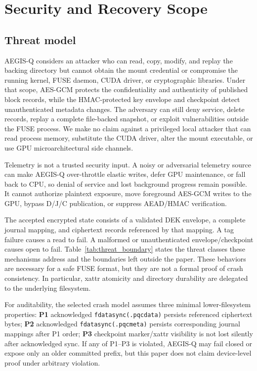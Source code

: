 \section{Security and Recovery Scope}
\label{sec:security}

\subsection{Threat model}
\label{sec:case_study}

AEGIS-Q considers an attacker who can read, copy, modify, and replay the backing directory but cannot obtain the mount credential or compromise the running kernel, FUSE daemon, CUDA driver, or cryptographic libraries.  Under that scope, AES-GCM protects the confidentiality and authenticity of published block records, while the HMAC-protected key envelope and checkpoint detect unauthenticated metadata changes.  The adversary can still deny service, delete records, replay a complete file-backed snapshot, or exploit vulnerabilities outside the FUSE process.  We make no claim against a privileged local attacker that can read process memory, substitute the CUDA driver, alter the mount executable, or use GPU microarchitectural side channels.

Telemetry is not a trusted security input.  A noisy or adversarial telemetry source can make AEGIS-Q over-throttle elastic writes, defer GPU maintenance, or fall back to CPU, so denial of service and lost background progress remain possible.  It cannot authorize plaintext exposure, move foreground AES-GCM writes to the GPU, bypass D/J/C publication, or suppress AEAD/HMAC verification.

The accepted encrypted state consists of a validated DEK envelope, a complete journal mapping, and ciphertext records referenced by that mapping.  A tag failure causes a read to fail.  A malformed or unauthenticated envelope/checkpoint causes open to fail.  Table~\ref{tab:threat_boundary} states the threat classes these mechanisms address and the boundaries left outside the paper.  These behaviors are necessary for a safe FUSE format, but they are not a formal proof of crash consistency.  In particular, xattr atomicity and directory durability are delegated to the underlying filesystem.

For auditability, the selected crash model assumes three minimal lower-filesystem properties: \textbf{P1} acknowledged \texttt{fdatasync(.pqcdata)} persists referenced ciphertext bytes; \textbf{P2} acknowledged \texttt{fdatasync(.pqcmeta)} persists corresponding journal mappings after P1 order; \textbf{P3} checkpoint marker/xattr visibility is not lost silently after acknowledged sync.  If any of P1--P3 is violated, AEGIS-Q may fail closed or expose only an older committed prefix, but this paper does not claim device-level proof under arbitrary violation.

